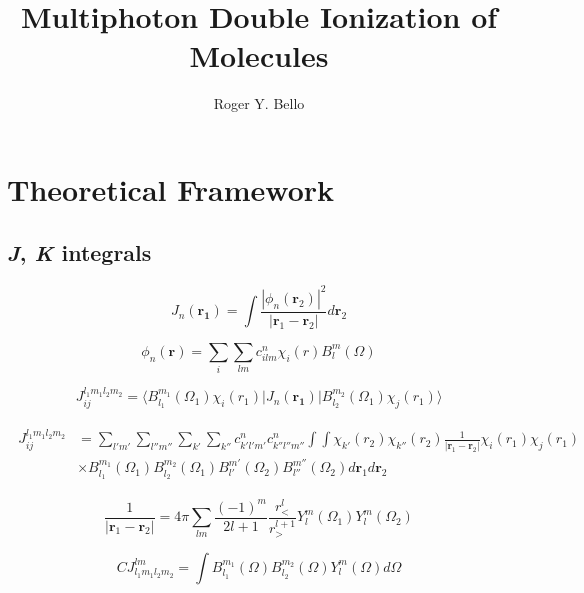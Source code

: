 \documentclass[nobibnotes, amssymb,aps,superscriptaddress]{revtex4-1}
\begin{document}
\title{Multiphoton Double Ionization of Molecules}

\author{Roger Y. Bello}

\maketitle

\section{Theoretical Framework}
\subsection{\textit{J}, \textit{K} integrals}
\begin{equation}
J_n(\mathbf{r_1})=\int \frac{|\phi_n(\mathbf{r}_2)|^2}{|\mathbf{r}_1-\mathbf{r}_2|}d\mathbf{r}_2
\end{equation}

\begin{equation}
\phi_n(\mathbf{r})=\sum_i \sum_{lm} c_{ilm}^n \chi_i(r)B_l^m(\Omega)
\end{equation}

\begin{equation}
J_{ij}^{l_1m_1l_2m_2}=\langle B_{l_1}^{m_1}(\Omega_1) \chi_i(r_1) |J_n(\mathbf{r_1})| B_{l_2}^{m_2}(\Omega_1) \chi_j(r_1)\rangle
\end{equation}

\begin{eqnarray}
\begin{split}
J_{ij}^{l_1m_1l_2m_2}&=\sum_{l'm'}\sum_{l''m''}\sum_{k'}\sum_{k''} c_{k'l'm'}^n c_{k''l''m''}^n \int \int \chi_{k'}(r_2) \chi_{k''}(r_2)\frac{1}{|\mathbf{r}_1-\mathbf{r}_2|}\chi_{i}(r_1) \chi_{j}(r_1)\\
& \times B_{l_1}^{m_1}(\Omega_1) B_{l_2}^{m_2}(\Omega_1) B_{l'}^{m'}(\Omega_2) B_{l''}^{m''}(\Omega_2) d\mathbf{r}_1d\mathbf{r}_2
\end{split}
\end{eqnarray}

\begin{equation}
\frac{1}{|\mathbf{r}_1-\mathbf{r}_2|}=4\pi \sum_{lm}\frac{(-1)^m}{2l+1}\frac{r^l_{<}}{r^{l+1}_>}Y_l^m(\Omega_1)Y_l^m(\Omega_2)
\end{equation}

\begin{equation}
CJ_{l_1m_1l_2m_2}^{lm}=\int B_{l_1}^{m_1}(\Omega) B_{l_2}^{m_2}(\Omega)Y_l^m(\Omega) d\Omega
\end{equation}
\end{document}

